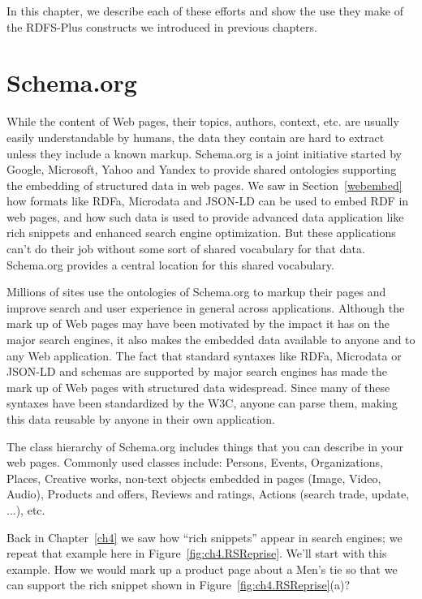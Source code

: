 In this chapter, we describe each of these efforts and show the use they
make of the RDFS-Plus constructs we introduced in previous chapters.

\section{Schema.org}
\label{schema.org}
While the content of Web pages, their topics, authors, context, etc. are usually easily 
understandable by humans, the data they contain are hard to extract unless they include a 
known markup. Schema.org is a joint initiative started by Google, Microsoft, Yahoo and 
Yandex to provide shared ontologies supporting the embedding of structured data in web 
pages. We saw in Section~\ref{webembed} how formats like RDFa, Microdata and JSON-LD can 
be used to embed RDF in web pages, and how such data is used to provide
advanced data application like rich snippets and enhanced search engine optimization. 
But these applications can't do their job without some sort of shared vocabulary 
for that data.  Schema.org provides a central location for this shared vocabulary. 

Millions of sites use the ontologies of Schema.org to markup their pages and improve search and user experience 
in general across applications. Although the mark up of Web pages may have been motivated by the impact it 
has on the major search engines, it also makes the embedded data available to anyone and to any Web application. 
The fact that standard syntaxes like RDFa, Microdata or JSON-LD and schemas are supported by major search 
engines has made the mark up of Web pages with structured data  widespread.  Since many of these syntaxes have been standardized by the W3C, anyone can parse them, making this data reusable by anyone in their own application. 


The class hierarchy of Schema.org includes things that you can describe in 
your web pages. 
Commonly used classes include: Persons, Events, Organizations, Places, Creative works, non-text objects 
embedded in pages (Image, Video, Audio), Products and offers, Reviews and ratings, Actions (search trade, update, ...), etc.

Back in Chapter~\ref{ch4} we saw how ``rich snippets'' appear in search engines; we repeat that example here in 
Figure~\ref{fig:ch4.RSReprise}. We'll start with this example.  How we would mark up a product page about 
a Men's tie so that we can support the rich snippet shown in Figure~\ref{fig:ch4.RSReprise}(a)?

